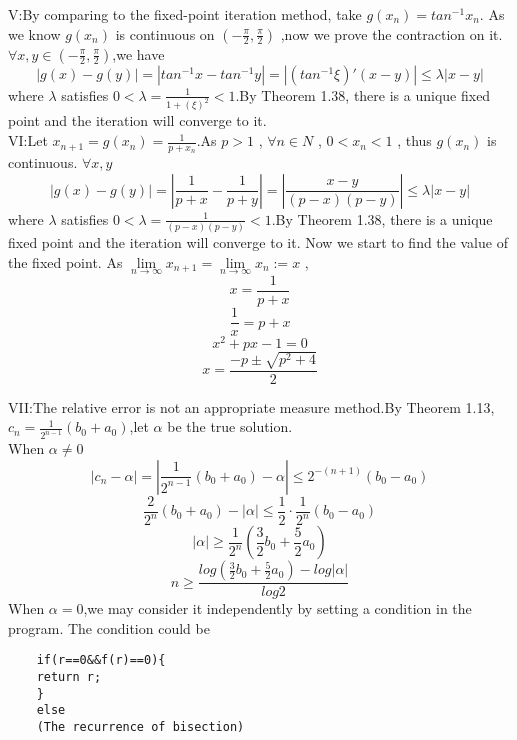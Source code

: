 \documentclass{ctexart}
\begin{document}
V:By comparing to the fixed-point iteration method, take $g(x_n)=tan^{-1}x_n$. As we know $g(x_n)$ is continuous on $(-\frac{\pi}{2},\frac{\pi}{2})$ ,now we prove the contraction on it. $\forall x,y \in (-\frac{\pi}{2},\frac{\pi}{2})$,we have
$$|g(x)-g(y)|=|tan^{-1}x-tan^{-1}y|=|(tan^{-1} \xi)' (x-y)| \leq \lambda |x-y|$$
where $\lambda$ satisfies $0<\lambda=\frac{1}{1+ (\xi)^2}<1$.By Theorem 1.38, there is a unique fixed point and the iteration will converge to it.
\\

VI:Let $x_{n+1}=g(x_n)=\frac{1}{p+x_n}$.As $p>1$ , $\forall n \in N$ , $0<x_n<1$ , thus $g(x_n)$ is continuous. $\forall x,y$
$$|g(x)-g(y)|=|\frac{1}{p+x}-\frac{1}{p+y}|=|\frac{x-y}{(p-x)(p-y)}| \leq \lambda |x-y|$$
where $\lambda$ satisfies $0< \lambda=\frac{1}{(p-x)(p-y)}<1$.By Theorem 1.38, there is a unique fixed point and the iteration will converge to it. Now we start to find the value of the fixed point. As $ \lim\limits_{n \to \infty} x_{n+1}=\lim\limits_{n \to \infty} x_n := x$ ,
$$x=\frac{1}{p+x}$$
$$\frac{1}{x}=p+x$$
$$x^2+px-1=0$$
$$x=\frac{-p \pm \sqrt{p^2+4}}{2}$$

VII:The relative error is not an appropriate measure method.By Theorem 1.13, $c_n=\frac{1}{2^{n-1}}(b_0+a_0)$,let $\alpha$ be the true solution.
\\When $\alpha \neq 0$ 
$$|c_n-\alpha|=|\frac{1}{2^{n-1}}(b_0+a_0) -\alpha| \leq 2^{-(n+1)}(b_0-a_0)$$
$$\frac{2}{2^n}(b_0+a_0)-|\alpha| \leq \frac{1}{2} \cdot \frac{1}{2^n}(b_0-a_0)$$
$$|\alpha| \geq \frac{1}{2^n} (\frac{3}{2}b_0+\frac{5}{2}a_0)$$
$$n \geq \frac{log(\frac{3}{2}b_0+\frac{5}{2}a_0)-log|\alpha|}{log 2}$$
When $\alpha = 0$,we may consider it independently by setting a condition in the program. The condition could be 
\begin{verbatim}
    if(r==0&&f(r)==0){
    return r;
    }
    else 
    (The recurrence of bisection)
\end{verbatim}
\end{document}
